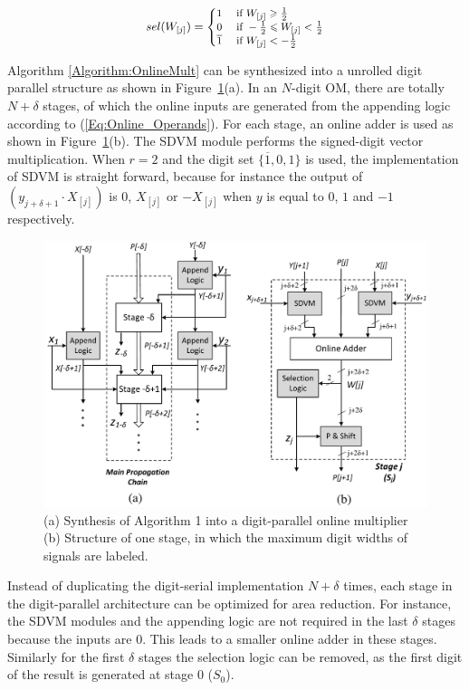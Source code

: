 \documentclass{acm_proc_article-sp}
\begin{document}
\vspace{-2ex}
\begin{eqnarray}\label{Eq:SelFunc_OM}
\small
  sel(W_{[j]})=\begin{cases}
    1 & \text{ if } W_{[j]} \geqslant \frac{1}{2} \\
    0 & \text{ if } -\frac{1}{2}\leqslant W_{[j]}<\frac{1}{2} \\
    \overline{1} & \text{ if } W_{[j]}<-\frac{1}{2}
  \end{cases}
\normalsize
\end{eqnarray}

Algorithm \ref{Algorithm:OnlineMult} can be synthesized into a unrolled digit parallel structure as shown in  Figure~\ref{Fig:Radix2OnlineMultiplier}(a). In an $N$-digit OM, there are totally $N+\delta$ stages, of which the online inputs are generated from the appending logic according to (\ref{Eq:Online_Operands}). For each stage, an online adder is used as shown in Figure~\ref{Fig:Radix2OnlineMultiplier}(b). The SDVM module performs the signed-digit vector multiplication. When $r=2$ and the digit set $\{\overline{1},0,1\}$ is used, the implementation of SDVM is straight forward, because for instance the output of $(y_{j+\delta+1}\cdot X_{[j]})$ is 0, $X_{[j]}$ or $-X_{[j]}$ when $y$ is equal to $0$, $1$ and $-1$ respectively.\vspace{-1ex}

\begin{figure}[tbp]
\centering
\includegraphics[width=.49\textwidth]{./Figures/OnlineMult_Unrolled.pdf}
\vspace{-4ex}
\caption{(a) Synthesis of Algorithm 1 into a digit-parallel online multiplier (b) Structure of one stage, in which the maximum digit widths of signals are labeled.}
\vspace{-2ex}
\label{Fig:Radix2OnlineMultiplier}
\end{figure}

Instead of duplicating the digit-serial implementation $N+\delta$ times, each stage in the digit-parallel architecture can be optimized for area reduction. For instance, the SDVM modules and the appending logic are not required in the last $\delta$ stages because the inputs are 0. This leads to a smaller online adder in these stages. Similarly for the first $\delta$ stages the selection logic can be removed, as the first digit of the result is generated at stage 0 ($S_0$).
\end{document}
